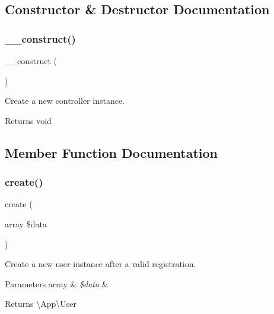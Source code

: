 \subsection{Constructor \& Destructor Documentation}
\mbox{\label{class_app_1_1_http_1_1_controllers_1_1_auth_1_1_register_controller_a095c5d389db211932136b53f25f39685}} 
\subsubsection{\texorpdfstring{\_\_construct()}{\_\_construct()}}
{\footnotesize\ttfamily \+\_\+\+\_\+construct (\begin{DoxyParamCaption}{ }\end{DoxyParamCaption})}

Create a new controller instance.

\begin{DoxyReturn}{Returns}
void 
\end{DoxyReturn}


\subsection{Member Function Documentation}
\mbox{\label{class_app_1_1_http_1_1_controllers_1_1_auth_1_1_register_controller_a791ba6c150a0a3047c7d8735e62cad02}} 
\subsubsection{\texorpdfstring{create()}{create()}}
{\footnotesize\ttfamily create (\begin{DoxyParamCaption}\item[{array}]{\$data }\end{DoxyParamCaption})\hspace{0.3cm}{\ttfamily [protected]}}

Create a new user instance after a valid registration.


\begin{DoxyParams}[1]{Parameters}
array & {\em \$data} & \\
\hline
\end{DoxyParams}
\begin{DoxyReturn}{Returns}
\textbackslash{}\+App\textbackslash{}\+User 
\end{DoxyReturn}
\mbox{\label{class_app_1_1_http_1_1_controllers_1_1_auth_1_1_register_controller_aa47350de63ea5295d9c9718e3d09135c}} 
